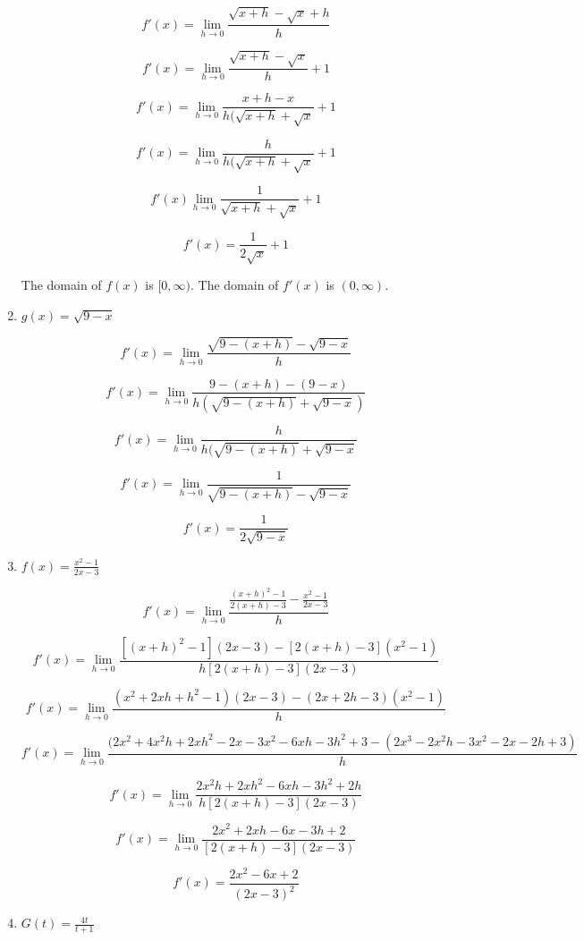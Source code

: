 \documentclass{article}
\begin{document}
\begin{enumerate}
			$$f'(x) = \lim \limits _{h \to 0} \frac{\sqrt{x+h} - \sqrt{x} + h}{h}$$

			$$f'(x) = \lim \limits _{h \to 0} \frac{\sqrt{x+h} - \sqrt{x}}{h} + 1$$

			$$f'(x) = \lim \limits _{h \to 0} \frac{x + h - x}{h(\sqrt{x+h} + \sqrt{x}} + 1$$

			$$f'(x) = \lim \limits _{h \to 0} \frac{h}{h(\sqrt{x+h} + \sqrt{x}} + 1$$

			$$f'(x) \lim \limits _{h \to 0} \frac{1}{\sqrt{x+h} + \sqrt{x}} + 1$$

			$$f'(x) = \frac{1}{2\sqrt{x}} + 1$$

			The domain of $f(x)$ is $[0, \infty)$. The domain of $f'(x)$ is $(0, \infty)$.

		\item $g(x) = \sqrt{9-x}$

			$$f'(x) = \lim \limits _{h \to 0} \frac{\sqrt{9-(x+h)} - \sqrt{9-x}}{h}$$

			$$f'(x) = \lim \limits _{h \to 0} \frac{9-(x+h)-(9-x)}{h(\sqrt{9-(x+h)}+\sqrt{9-x})}$$

			$$f'(x) = \lim \limits _{h \to 0} \frac{h}{h(\sqrt{9-(x+h)}+\sqrt{9-x}}$$

			$$f'(x) = \lim \limits _{h \to 0} \frac{1}{\sqrt{9-(x+h)}-\sqrt{9-x}}$$

			$$f'(x) = \frac{1}{2\sqrt{9-x}}$$

		\item $f(x) = \frac{x^2 - 1}{2x - 3}$

			$$f'(x) = \lim \limits _{h \to 0} \frac{\frac{(x+h)^2-1}{2(x+h)-3} - \frac{x^2-1}{2x-3}}{h}$$

			$$f'(x) = \lim \limits _{h \to 0} \frac{[(x+h)^2-1](2x-3) - [2(x+h)-3](x^2-1)}{h[2(x+h)-3](2x-3)}$$

			$$f'(x) = \lim \limits _{h \to 0} \frac{(x^2+2xh+h^2-1)(2x-3)-(2x+2h-3)(x^2-1)}{h}$$

			$$f'(x) = \lim \limits _{h \to 0} \frac{(2x^2+4x^2h+2xh^2-2x-3x^2-6xh-3h^2+3-(2x^3-2x^2h-3x^2-2x-2h+3)}{h}$$

			$$f'(x) = \lim \limits _{h \to 0} \frac{2x^2h+2xh^2-6xh-3h^2+2h}{h[2(x+h)-3](2x-3)}$$

			$$f'(x) = \lim \limits _{h \to 0} \frac{2x^2+2xh-6x-3h+2}{[2(x+h)-3](2x-3)}$$

			$$f'(x) = \frac{2x^2-6x+2}{(2x-3)^2}$$

		\item $G(t) = \frac{4t}{t+1}$


\end{enumerate}
\end{document}
